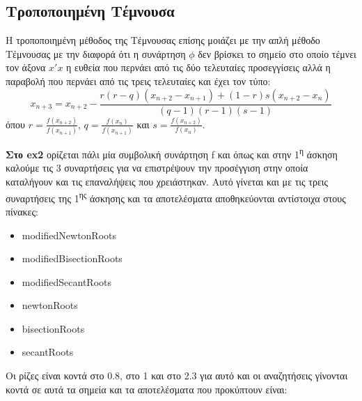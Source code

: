 \documentclass[a4paper,11pt]{article}
\begin{document}
\begin{flushleft}
\subsection*{Τροποποιημένη Τέμνουσα}
Η τροποποιημένη μέθοδος της Τέμνουσας επίσης μοιάζει με την απλή μέθοδο Τέμνουσας με την διαφορά ότι η συνάρτηση $\phi$ δεν βρίσκει το σημείο στο οποίο τέμνει τον άξονα $x'x$ η ευθεία που περνάει από τις δύο τελευταίες προσεγγίσεις αλλά η παραβολή που περνάει από τις τρεις τελευταίες και έχει τον τύπο: 
$$x_{n+3} = x_{n+2} - \frac{r(r-q)(x_{n+2}-x_{n+1})+(1-r)s(x_{n+2}-x_n)}{(q-1)(r-1)(s-1)}$$
όπου $r = \frac{f(x_{n+2})}{f(x_{n+1})}$, $q = \frac{f(x_n)}{f(x_{n+1})}$ και $s = \frac{f(x_{n+2})}{f(x_n)}$.
\linebreak

\textbf{Στο ex2} ορίζεται πάλι μία συμβολική συνάρτηση f και όπως και στην 1\textsuperscript{η} άσκηση καλούμε τις 3 συναρτήσεις για να επιστρέψουν την προσέγγιση στην οποία καταλήγουν και τις επαναλήψεις που χρειάστηκαν. Αυτό γίνεται και με τις τρεις συναρτήσεις της 1\textsuperscript{ης} άσκησης και τα αποτελέσματα αποθηκεύονται αντίστοιχα στους πίνακες: 
\begin{itemize}
    \item modifiedNewtonRoots
    \item modifiedBisectionRoots
    \item modifiedSecantRoots
    \item newtonRoots
    \item bisectionRoots
    \item secantRoots
\end{itemize}

Οι ρίζες είναι κοντά στο 0.8, στο 1 και στο 2.3 για αυτό και οι αναζητήσεις γίνονται κοντά σε αυτά τα σημεία και τα αποτελέσματα που προκύπτουν είναι:


\end{flushleft}
\end{document}
